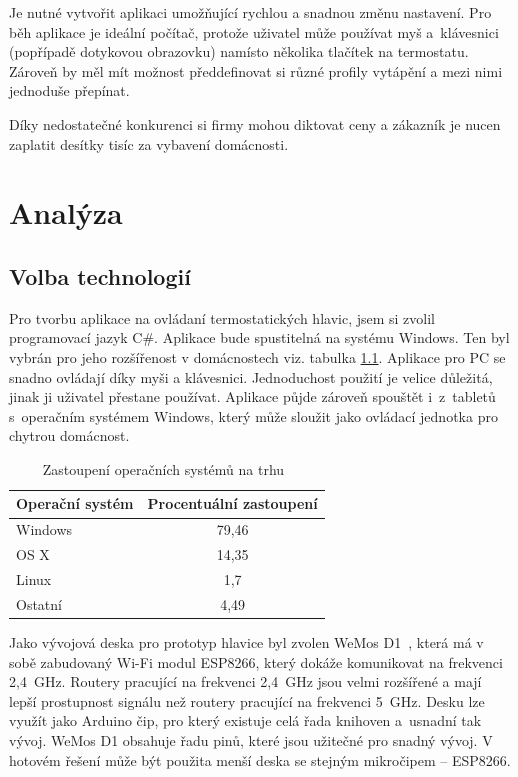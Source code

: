 \documentclass[thesis=B,czech]{FITthesis}[2012/10/20]
\begin{document}
Je nutné vytvořit aplikaci umožňující rychlou a snadnou změnu nastavení. Pro běh aplikace je ideální počítač, protože uživatel může používat myš a~klávesnici (popřípadě dotykovou obrazovku) namísto několika tlačítek na termostatu. Zároveň by měl mít možnost předdefinovat si různé profily vytápění a mezi nimi jednoduše přepínat.

Díky nedostatečné konkurenci si firmy mohou diktovat ceny a zákazník je nucen zaplatit desítky tisíc za vybavení domácnosti.

\chapter{Analýza}

\section{Volba technologií}

Pro tvorbu aplikace na ovládaní termostatických hlavic, jsem si zvolil programovací jazyk C\#. Aplikace bude spustitelná na systému Windows. Ten byl vybrán pro jeho rozšířenost v domácnostech viz. tabulka \ref{table:2}. Aplikace pro PC se snadno ovládají díky myši a klávesnici. Jednoduchost použití je velice důležitá, jinak ji uživatel přestane používat. Aplikace půjde zároveň spouštět i~z~tabletů s~operačním systémem Windows, který může sloužit jako ovládací jednotka pro chytrou domácnost.

     \begin{table}[]
         \begin{tabular}{lc}
            Operační systém & Procentuální zastoupení \\
            \hline
           Windows         & 79,46                   \\
           OS X            & 14,35                   \\
           Linux           & 1,7                     \\
           Ostatní         & 4,49                   
       \end{tabular}
\caption{Zastoupení operačních systémů na trhu~\cite{osPer}}
\label{table:2}
\end{table}

Jako vývojová deska pro prototyp hlavice byl zvolen WeMos D1~\cite{wemos}, která má v sobě zabudovaný Wi-Fi modul ESP8266, který dokáže komunikovat na frekvenci 2,4~GHz. Routery pracující na frekvenci 2,4~GHz jsou velmi rozšířené a mají lepší prostupnost signálu než routery pracující na frekvenci 5~GHz. Desku lze využít jako Arduino čip, pro který existuje celá řada knihoven a~usnadní tak vývoj. WeMos D1 obsahuje řadu pinů, které jsou užitečné pro snadný vývoj. V hotovém řešení může být použita menší deska se stejným mikročipem -- ESP8266.
\end{document}
